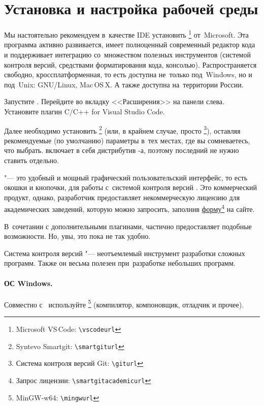 \section{Установка и настройка рабочей среды}\label{sect:workEnv}
Мы настоятельно рекомендуем в~качестве IDE установить \href{\vscodeurl}{}\footnote{\textenglish{Microsoft VS\,Code:} \nolinkurl{\vscodeurl}} от~Microsoft. Эта программа активно развивается, имеет полноценный современный редактор кода и поддерживает интеграцию со~множеством полезных инструментов (системой контроля версий, средствами форматирования кода, консолью). Распространяется свободно, кроссплатформенная, то есть доступна не~только под~Windows, но и под~Unix: GNU/Linux, Mac\,OS\,X. А также доступна на~территории России.

Запустите . Перейдите во вкладку <<Расширения>> на панели слева. Установите плагин \textenglish{C/C++ for Visual Studio Code}.

Далее необходимо установить \href{\smartgiturl}{}\footnote{Syntevo Smartgit: \nolinkurl{\smartgiturl}} (или, в крайнем случае, просто \href{\giturl}{\git}\footnote{Система контроля версий Git: \nolinkurl{\giturl}}), оставляя рекомендуемые (по умолчанию) параметры в~тех местах, где вы сомневаетесь, что выбрать.  включает в себя дистрибутив \git-а, поэтому последний не нужно ставить отдельно.

 "--- это удобный и мощный графический пользовательский интерфейс, то есть окошки и кнопочки, для работы с~системой контроля версий \git. Это коммерческий продукт, однако, разработчик предоставляет некоммерческую лицензию для академических заведений, которую можно запросить, заполнив \href{\smartgitacademicurl}{форму}\footnote{Запрос лицензии: \nolinkurl{\smartgitacademicurl}} на сайте.

В~сочетании с дополнительными плагинами,  частично предоставляет подобные возможности. Но, увы, это пока не так удобно.

Система контроля версий "--- неотъемлемый инструмент разработки сложных программ. Также он весьма полезен при~разработке небольших программ.



\paragraph{ОС Windows.}
Совместно с~ используйте \href{\mingwurl}{}\footnote{MinGW-w64: \nolinkurl{\mingwurl}} (компилятор, компоновщик, отладчик и прочее).

